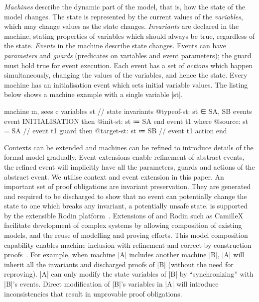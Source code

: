\emph{Machines} describe the dynamic part of the model, that is, how
the state of the model changes. The state is represented by the
current values of the \emph{variables}, which may change values as the
state changes.  \emph{Invariants} are declared in the machine, stating
properties of variables which should always be true, regardless of the
state.  \emph{Events} in the machine describe state changes.  Events
can have \emph{parameters} and \emph{guards} (predicates on variables and event
parameters); the guard must hold true for event execution.  Each
event has a set of \emph{actions} which happen simultaneously,
changing the values of the variables, and hence the state. Every
machine has an initialisation event which sets initial variable
values. The listing below shows a machine example with a single variable |st|. 
\begin{EventBcode}
machine m, sees c
variables st // state
invariants @typeof-st: st ∈ {SA, SB}
events
	event INITIALISATION
	then @init-st: st ≔ SA
	end
	event t1
	where @source: st = SA   // event t1 guard
	then @target-st: st ≔ SB  // event t1 action
end 
\end{EventBcode} Contexts can be extended and machines can be refined to introduce details of the formal model gradually. 
Event extensions enable refinement of abstract events, the refined event will implicitly have all the parameters, guards and actions of the abstract event. We utilise context and event extension in this paper.
An important set of proof obligations are invariant
preservation.  They are generated and required to be discharged to
show that no event can potentially change the state to one which
breaks any invariant, a potentially unsafe state. \EventB is supported by the extensible Rodin platform~\cite{abrial10:_rodin}. Extensions of \EventB and Rodin such as CamilleX~\cite{DBLP:conf/sefm/HoangSDFB22} facilitate development of complex systems by allowing composition of existing models, and the reuse of modelling and proving efforts. This model composition capability enables machine inclusion with refinement and correct-by-construction proofs~\cite{ICECCS2017-CamilleX}.  For example, when machine |A| includes another machine |B|, |A| will inherit all the invariants and discharged proofs of |B| (without the need for reproving).  |A| can only modify the state variables of |B| by ``synchronizing'' with |B|'s events. Direct modification of |B|'s variables in |A| will introduce inconsistencies that result in unprovable proof obligations.

